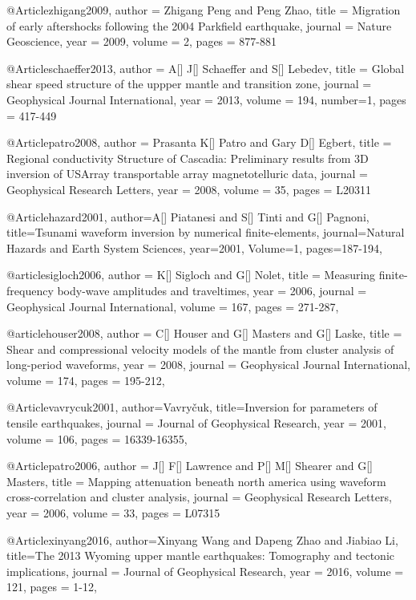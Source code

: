@Article{zhigang2009,
  author = 	 {Zhigang Peng and Peng Zhao},
  title = 	 {Migration of early aftershocks following the 2004 Parkfield earthquake},
  journal = 	 {Nature Geoscience},
  year = 	 2009,
  volume = 2,
  pages =	 {877-881}
}

@Article{schaeffer2013,
  author = 	 {A[] J[] Schaeffer and S[] Lebedev},
  title = 	 {Global shear speed structure of the uppper mantle and transition zone},
  journal = 	 {Geophysical Journal International},
  year = 	 2013,
  volume = 194,
  number=1,
  pages =	 {417-449}
}

@Article{patro2008,
  author = 	 {Prasanta K[] Patro and Gary D[] Egbert},
  title = 	 {Regional conductivity Structure of Cascadia: Preliminary results from 3D inversion of USArray transportable array magnetotelluric data},
  journal = 	 {Geophysical Research Letters},
  year = 	 2008,
  volume = 35,
  pages =	 {L20311}
}

@Article{hazard2001,
  author={A[] Piatanesi and S[] Tinti and G[] Pagnoni},
  title={Tsunami waveform inversion by numerical finite-elements},
  journal={Natural Hazards and Earth System Sciences},
  year=2001,
  Volume=1,
  pages={187-194},
}

@article{sigloch2006,
author = {K[] Sigloch and G[] Nolet},
title = {Measuring finite-frequency body-wave amplitudes and traveltimes},
year = {2006},
journal = {Geophysical Journal International},
volume = {167},
pages = {271-287},
}

@article{houser2008,
author = {C[] Houser and G[] Masters and G[] Laske},
title = {Shear and compressional velocity models of the mantle from cluster analysis of long-period waveforms},
year = {2008},
journal = {Geophysical Journal International},
volume = {174},
pages = {195-212},
}


@Article{vavrycuk2001,
  author={Vavry\v{c}uk},
  title={Inversion for parameters of tensile earthquakes},
  journal = 	 {Journal of Geophysical Research},
  year = 	 2001,
  volume =	 106,
  pages =	 {16339-16355},
}

@Article{patro2006,
  author = 	 {J[] F[] Lawrence and P[] M[] Shearer and G[] Masters},
  title = 	 {Mapping attenuation beneath north america using waveform cross-correlation and cluster analysis},
  journal = 	 {Geophysical Research Letters},
  year = 	 2006,
  volume = 33,
  pages =	 {L07315}
}

@Article{xinyang2016,
  author={Xinyang Wang and Dapeng Zhao and Jiabiao Li},
  title={The 2013 Wyoming upper mantle earthquakes: Tomography and tectonic implications},
  journal = 	 {Journal of Geophysical Research},
  year = 	 2016,
  volume =	 121,
  pages =	 {1-12},
}


